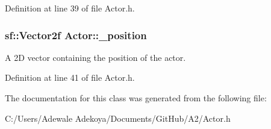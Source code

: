Definition at line 39 of file Actor.\+h.

\hypertarget{class_actor_ad3760883a99be5b4aaa2635ca761c29b}{}
\subsubsection[{\+\_\+position}]{\setlength{\rightskip}{0pt plus 5cm}sf\+::\+Vector2f Actor\+::\+\_\+position\hspace{0.3cm}{\ttfamily [protected]}}\label{class_actor_ad3760883a99be5b4aaa2635ca761c29b}
A 2\+D vector containing the position of the actor. 

Definition at line 41 of file Actor.\+h.



The documentation for this class was generated from the following file\+:\begin{DoxyCompactItemize}
\item 
C\+:/\+Users/\+Adewale Adekoya/\+Documents/\+Git\+Hub/\+A2/Actor.\+h\end{DoxyCompactItemize}
